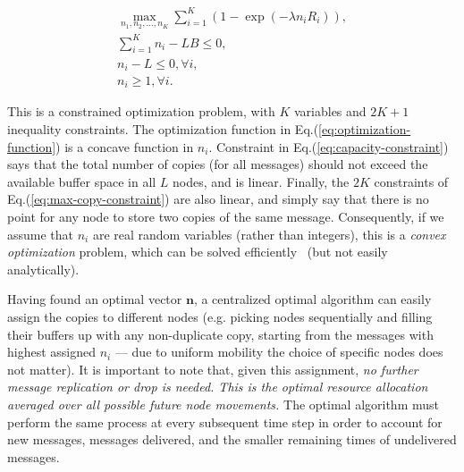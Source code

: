 \begin{eqnarray}
\underset{n_{1},n_{2},\dots,n_{K}}{\max} \sum_{i=1}^{K} (1-\exp(-\lambda n_i R_i)) \label{eq:optimization-function}, \\
\sum_{i=1}^{K} n_{i} - L B \le 0 \label{eq:capacity-constraint}, \\
n_{i} - L  \le 0, \forall i \label{eq:max-copy-constraint}, \\
n_{i} \geq 1, \forall i \label{eq:min-copy-constraint}.
\end{eqnarray}

This is a constrained optimization problem, with $K$ variables and $2K+1$ inequality constraints. The optimization function in Eq.(\ref{eq:optimization-function}) is a concave function in $n_{i}$. Constraint in Eq.(\ref{eq:capacity-constraint}) says that the total number of copies (for all messages) should not exceed the available buffer space in all $L$ nodes, and is linear. Finally, the $2K$ constraints of Eq.(\ref{eq:max-copy-constraint}) are also linear, and simply say that there is no point for any node to store two copies of the same message. Consequently, if we assume that $n_{i}$ are real random variables (rather than integers), this is a \emph{convex optimization} problem, which can be solved efficiently~\cite{Boyd:convex-optimization-book} (but not easily analytically).

Having found an optimal vector $\mathbf{n}$, a centralized optimal algorithm can easily assign the copies to different nodes (e.g. picking nodes sequentially and filling their buffers up with any non-duplicate copy, starting from the messages with highest assigned $n_{i}$ --- due to uniform mobility the choice of specific nodes does not matter). It is important to note that, given this assignment, \emph{no further message replication or drop is needed. This is the optimal resource allocation averaged over all possible future node movements.} The optimal algorithm must perform the same process at every subsequent time step in order to account for new messages, messages delivered, and the smaller remaining times of undelivered messages.

